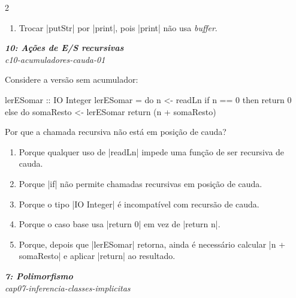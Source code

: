 \documentclass[a4paper,10pt,brazil]{article}
\begin{document}
\begin{multicols}{2}
\begin{enumerate}
  \item Trocar \haskellinline|putStr| por \haskellinline|print|, pois \haskellinline|print| não usa \emph{buffer}.


\end{enumerate}

\begin{flushright}
  \footnotesize
  \textit{\textbf{10: Ações de E/S recursivas}}\\
  \textit{c10-acumuladores-cauda-01}\\

\end{flushright}
Considere a versão sem acumulador:

\begin{haskellcode}
lerESomar :: IO Integer
lerESomar = do
  n <- readLn
  if n == 0
    then return 0
    else do
      somaResto <- lerESomar
      return (n + somaResto)
\end{haskellcode}

Por que a chamada recursiva não está em posição de cauda?

\begin{enumerate}
  \item Porque qualquer uso de \haskellinline|readLn| impede uma função de ser recursiva de cauda.

  \item Porque \haskellinline|if| não permite chamadas recursivas em posição de cauda.

  \item Porque o tipo \haskellinline|IO Integer| é incompatível com recursão de cauda.

  \item Porque o caso base usa \haskellinline|return 0| em vez de \haskellinline|return n|.

  \item Porque, depois que \haskellinline|lerESomar| retorna, ainda é necessário calcular \haskellinline|n + somaResto| e aplicar \haskellinline|return| ao resultado.


\end{enumerate}

\begin{flushright}
  \footnotesize
  \textit{\textbf{7: Polimorfismo}}\\
  \textit{cap07-inferencia-classes-implicitas}\\


\end{flushright}
\end{multicols}
\end{document}
